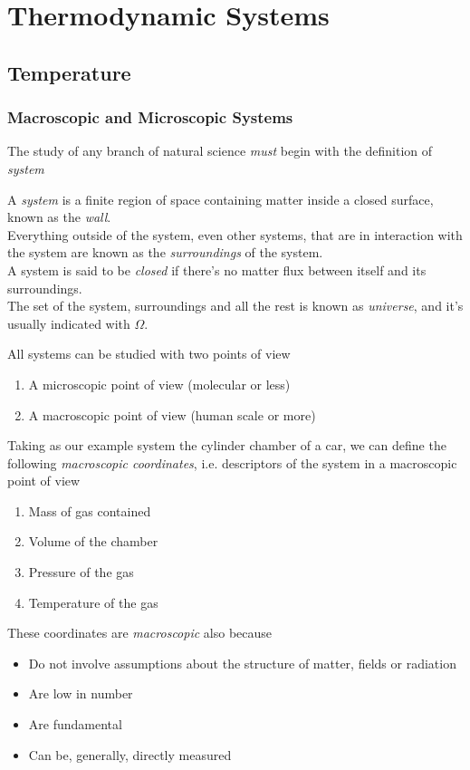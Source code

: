 \documentclass[../qm.tex]{subfiles}
\begin{document}
\chapter{Thermodynamic Systems}
\section{Temperature}
\subsection{Macroscopic and Microscopic Systems}
The study of any branch of natural science \textit{must} begin with the definition of \textit{system}
\begin{dfn}[System]
	A \textit{system} is a finite region of space containing matter inside a closed surface, known as the \textit{wall}.\\
	Everything outside of the system, even other systems, that are in interaction with the system are known as the \textit{surroundings} of the system.\\
	A system is said to be \textit{closed} if there's no matter flux between itself and its surroundings.\\
	The set of the system, surroundings and all the rest is known as \textit{universe}, and it's usually indicated with $\Omega$.
\end{dfn}
All systems can be studied with two points of view
\begin{enumerate}
\item A microscopic point of view (molecular or less)
\item A macroscopic point of view (human scale or more)
\end{enumerate}
Taking as our example system the cylinder chamber of a car, we can define the following \textit{macroscopic coordinates}, i.e. descriptors of the system in a macroscopic point of view
\begin{enumerate}
\item Mass of gas contained
\item Volume of the chamber
\item Pressure of the gas
\item Temperature of the gas
\end{enumerate}
These coordinates are \textit{macroscopic} also because
\begin{itemize}
\item Do not involve assumptions about the structure of matter, fields or radiation
\item Are low in number
\item Are fundamental
\item Can be, generally, directly measured
\end{itemize}
\end{document}
